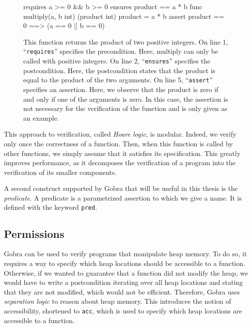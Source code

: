 \begin{figure}
    \begin{gobra}
requires a >= 0 && b >= 0
ensures  product == a * b
func multiply(a, b int) (product int) {
    product = a * b
    assert product == 0 ==> (a == 0 || b == 0)
}
    \end{gobra}
    \caption{This function returns the product of two positive integers. On line 1, “\texttt{requires}” specifies the precondition. Here, multiply can only be called with positive integers. On line 2, “\texttt{ensures}” specifies the postcondition. Here, the postcondition states that the product is equal to the product of the two arguments. On line 5, “\texttt{assert}” specifies an assertion. Here, we observe that the product is zero if and only if one of the arguments is zero. In this case, the assertion is not necessary for the verification of the function and is only given as an example.}
    \label{lst:multiply-example}
\end{figure}

This approach to verification, called \emph{Hoare logic}, is modular. Indeed, we verify only once the correctness of a function. Then, when this function is called by other functions, we simply assume that it satisfies its specification.
This greatly improves performance, as it decomposes the verification of a program into the verification of its smaller components.

A second construct supported by Gobra that will be useful in this thesis is the \emph{predicate}.
A predicate is a parametrized assertion to which we give a name.
It is defined with the keyword \texttt{pred}. 

\subsection{Permissions}
\label{sec:permissions}

Gobra can be used to verify programs that manipulate heap memory.
To do so, it requires a way to specify which heap locations should be accessible to a function.
Otherwise, if we wanted to guarantee that a function did not modify the heap, we would have to write a postcondition iterating over all heap locations and stating that they are not modified, which would not be efficient.
Therefore, Gobra uses \emph{separation logic} to reason about heap memory. This introduces the notion of accessibility, shortened to \texttt{acc}, which is used to specify which heap locations are accessible to a function.

